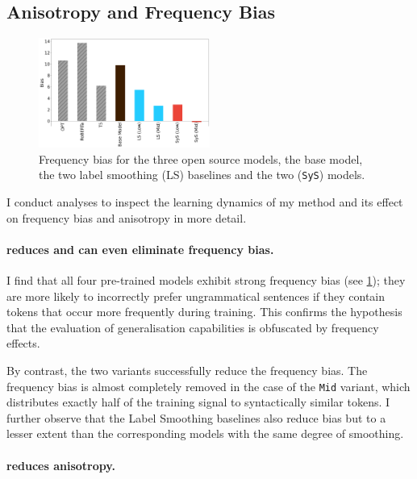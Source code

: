 \subsection{Anisotropy and Frequency Bias}

\begin{figure}
    \vspace{-1em}
    \centering
    \includegraphics[width=0.5\textwidth]{chapters/syntatic-smoothing/figures/biases.png}
    \caption{Frequency bias for the three open source models, the base model, the two label smoothing (LS) baselines and the two \smoothing (\texttt{SyS}) models.}
    \label{fig:biases}
    \vspace{-2em}
\end{figure}

I conduct analyses to inspect the learning dynamics of my method and its effect on frequency bias and anisotropy in more detail. 

\paragraph{\smoothing reduces and can even eliminate frequency bias.}
I find that all four pre-trained models exhibit strong frequency bias (see \cref{fig:biases}); they are more likely to incorrectly prefer ungrammatical sentences if they contain tokens that occur more frequently during training. This confirms the hypothesis that the evaluation of generalisation capabilities is obfuscated by frequency effects. 

By contrast, the two \smoothing variants successfully reduce the frequency bias. The frequency bias is almost completely removed in the case of the \texttt{Mid} variant, which distributes exactly half of the training signal to syntactically similar tokens. I further observe that the Label Smoothing baselines also reduce bias but to a lesser extent than the corresponding \smoothing models with the same degree of smoothing. 


\paragraph{\smoothing reduces anisotropy.}

